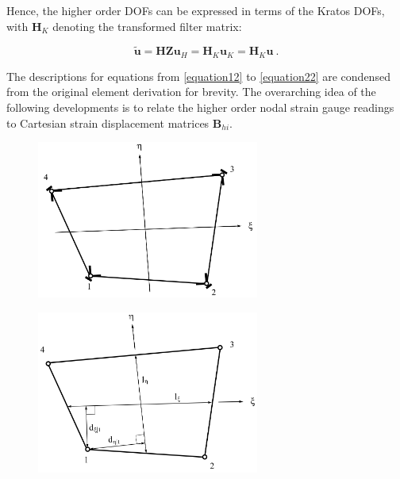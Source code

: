 Hence, the higher order DOFs can be expressed in terms of the Kratos DOFs, with $\mathbf{H}_K$ denoting the transformed filter matrix:

\begin{equation} 
\widetilde{\mathbf{u}} = \mathbf{H Z} \mathbf{u}_H = \mathbf{H}_K \mathbf{u}_K = \mathbf{H}_K \mathbf{u}
\label{equation11_3}\ .
\end{equation}

The descriptions for equations from \eqref{equation12} to \eqref{equation22} are condensed from the original element derivation \cite{Hau94} for brevity. The overarching idea of the following developments is to relate the higher order nodal strain gauge readings to Cartesian strain displacement matrices $\mathbf{B}_{hi}$.

\begin{figure}[H]
	\begin{minipage}{.5\textwidth}
		\centering
		\includegraphics[width=7.3cm]
		{images/ANDES_strain_gauges.png}
		\label{fig:andes_gauges}
	\end{minipage}%
	\begin{minipage}{.5\textwidth}
		\centering
		\includegraphics[width=7.3cm]
		{images/andes_geometric_quantities.png}
		\label{fig:andes_dims}
	\end{minipage}
\end{figure}

